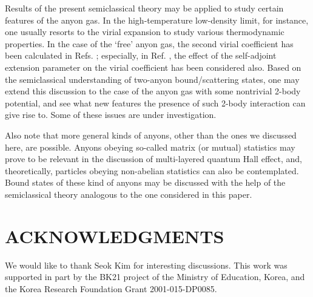\documentclass[a4paper,aps,eqsecnum,preprint,preprintnumbers,12pt]{revtex4}
\begin{document}
Results of the present semiclassical theory may be applied to
study certain features of the anyon gas. In the high-temperature
low-density limit, for instance, one usually resorts to the virial
expansion to study various thermodynamic properties. In the case
of the `free' anyon gas, the second virial coefficient has been
calculated in Refs. \cite{arovas2, moroz, kim3}; especially, in
Ref. \cite{kim3}, the effect of the self-adjoint extension
parameter on the virial coefficient has been considered also.
Based on the semiclassical understanding of two-anyon
bound/scattering states, one may extend this discussion to the
case of the anyon gas with some nontrivial 2-body potential, and
see what new features the presence of such 2-body interaction can
give rise to. Some of these issues are under investigation.

Also note that more general kinds of anyons, other than the ones
we discussed here, are possible. Anyons obeying so-called matrix
(or mutual) statistics \cite{wen, kim4} may prove to be relevant
in the discussion of multi-layered quantum Hall effect, and,
theoretically, particles obeying non-abelian statistics
\cite{wilczek2, bak} can also be contemplated. Bound states of
these kind of anyons may be discussed with the help of the
semiclassical theory analogous to the one considered in this
paper.

\section*{ACKNOWLEDGMENTS}

We would like to thank Seok Kim for interesting discussions. This
work was supported in part by the BK21 project of the Ministry of
Education, Korea, and the Korea Research Foundation Grant
2001-015-DP0085.
\end{document}
